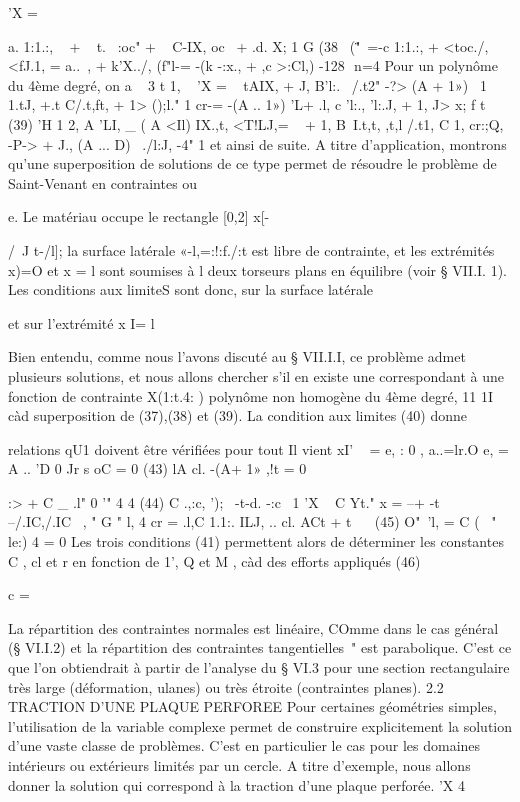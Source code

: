 'X = { a. 1:1.:, ~ + ~ t. ~:oc" + ~ C-IX, oc~ + .d. X; 1 
G 
(38~ 
{ (\""\0\ =-c 1:1.:, + <toc./, <fJ.1, = a..~, + k'X../, (f"l-= -(k -:x., + ,c >:Cl,) 
-128 ­
n=4 Pour un polynôme du 4ème degré, on a 
~ 3 	t 1, ~ 
'X = 	~ tAIX, + J, B'l:.~ /.t2" -?> (A + 1») ~1 1.tJ, +.t C/.t,ft}, + 1> ();l." 1 cr-= -(A .. 1») 'L+ .l, c 'l:., 'l:.J, + 1, J> x;
f 	t 
(39) 'H 	1 
2, A 'LI, 	_ ( A <Il) IX.,t,
<T!LJ,= ~ + 1, B~I.t,t, ,t,l /.t1, C 1,
cr:;Q,~ -P-> + J., (A ... D)~ ./l:J, -4"
1 
et ainsi de suite. A titre d'application, montrons qu'une superposition de solutions de ce type permet de résoudre le problème de Saint-Venant en contraintes ou 

e. 
Le matériau occupe le rectangle [0,2] x[-{/~J t-/l]; la surface latérale «-l,=:!:f./:t est libre de contrainte, et les extrémités x)=O et x = l sont soumises à
l 
deux torseurs plans en équilibre (voir § VII.I. 1). Les conditions aux limi­teS sont donc, sur la surface latérale 

et sur l'extrémité x I= l 

Bien entendu, comme nous l'avons discuté au § VII.I.I, ce problème admet plusieurs solutions, et nous allons chercher s'il en existe une correspondant à une fonction de contrainte X(1:t.4: ) polynôme non homogène du 4ème degré,
11 1I
càd 	superposition de (37),(38) et (39). La condition aux limites (40) donne 

relations qU1 doivent être vérifiées pour tout Il vient
xI' 
~ 
= e, 	: 0 , a..=lr.O e, = A .. 'D 0 Jr s oC = 0 
(43) 
lA cl. -(A+ 1» ,!t = 0 {:> + C _ .l" 0
'" 
4 	4 
(44) C .,:c, ');~ -t-d. -:c~ 1 'X ~ C Yt."
x = --+ -t --/.IC,/.IC~
, " G " l, 4 
cr = .l,C 1.1:. ILJ, .. cl. ACt + t
~~ 
(45) 
O"~'l, = C ( ~" le:)
4 
= 0 
Les trois conditions (41) permettent alors de déterminer les constantes C , cl et r en fonction de 1', Q et M , càd des efforts appliqués 
(46) 

c = 

La répartition des contraintes normales est linéaire, COmme dans le cas général (§ VI.I.2) et la répartition des contraintes tangentielles~" est parabolique. C'est ce que l'on obtiendrait à partir de l'analyse du § VI.3 pour une section rectangulaire très large (déformation, ulanes) ou très étroite (contraintes planes). 
2.2 TRACTION D'UNE PLAQUE PERFOREE 
Pour certaines géométries simples, l'utilisation de la variable complexe permet de construire explicitement la solution d'une vaste classe 
de problèmes. C'est en particulier le cas pour les domaines intérieurs ou extérieurs limités par un cercle. A titre d'exemple, nous allons donner la 
solution qui correspond à la traction d'une plaque perforée. 
'X 4 ~~ 

}}}
